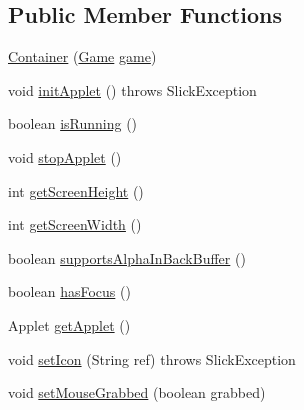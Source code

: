 \subsection*{Public Member Functions}
\begin{DoxyCompactItemize}
\item 
\mbox{\hyperlink{classorg_1_1newdawn_1_1slick_1_1_applet_game_container_1_1_container_a7bd5da0f75b3efe21dd7a756e3f37dd6}{Container}} (\mbox{\hyperlink{interfaceorg_1_1newdawn_1_1slick_1_1_game}{Game}} \mbox{\hyperlink{classorg_1_1newdawn_1_1slick_1_1_game_container_a6a38bb26e45e1c884940caf35c7cfcdc}{game}})
\item 
void \mbox{\hyperlink{classorg_1_1newdawn_1_1slick_1_1_applet_game_container_1_1_container_ac6699a7594b3c6512ab612b3e1421246}{init\+Applet}} ()  throws Slick\+Exception 
\item 
boolean \mbox{\hyperlink{classorg_1_1newdawn_1_1slick_1_1_applet_game_container_1_1_container_a7d46fd13a7dab1e1a1cc3cc49509d655}{is\+Running}} ()
\item 
void \mbox{\hyperlink{classorg_1_1newdawn_1_1slick_1_1_applet_game_container_1_1_container_a9e11859f475dfad8eb146c894b7cf814}{stop\+Applet}} ()
\item 
int \mbox{\hyperlink{classorg_1_1newdawn_1_1slick_1_1_applet_game_container_1_1_container_a60319d829f6ae2a5cfd74408738b2e68}{get\+Screen\+Height}} ()
\item 
int \mbox{\hyperlink{classorg_1_1newdawn_1_1slick_1_1_applet_game_container_1_1_container_abc0a573b767d1df3719c360678256ffc}{get\+Screen\+Width}} ()
\item 
boolean \mbox{\hyperlink{classorg_1_1newdawn_1_1slick_1_1_applet_game_container_1_1_container_af1977430579f9f5d755df1d32f8cb6dd}{supports\+Alpha\+In\+Back\+Buffer}} ()
\item 
boolean \mbox{\hyperlink{classorg_1_1newdawn_1_1slick_1_1_applet_game_container_1_1_container_aa908021f90696a22641508bbd09baeef}{has\+Focus}} ()
\item 
Applet \mbox{\hyperlink{classorg_1_1newdawn_1_1slick_1_1_applet_game_container_1_1_container_ad73e5ee76c671ae900d4f2e64e01f991}{get\+Applet}} ()
\item 
void \mbox{\hyperlink{classorg_1_1newdawn_1_1slick_1_1_applet_game_container_1_1_container_a88a1fdae24dae19ffdcbfafc5307da8b}{set\+Icon}} (String ref)  throws Slick\+Exception 
\item 
void \mbox{\hyperlink{classorg_1_1newdawn_1_1slick_1_1_applet_game_container_1_1_container_a65f7a506d56900f58e23e38be4460f5a}{set\+Mouse\+Grabbed}} (boolean grabbed)

\end{DoxyCompactItemize}
